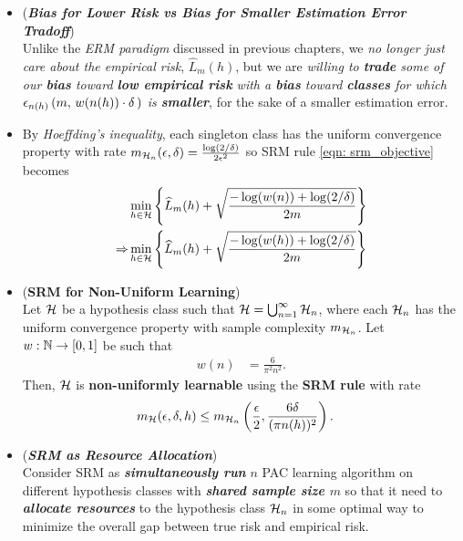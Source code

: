 \documentclass[11pt]{article}
\begin{document}
\begin{itemize}
\item \begin{remark} (\emph{\textbf{Bias for Lower Risk vs Bias for Smaller Estimation Error Tradoff}})\\
Unlike the \emph{ERM paradigm} discussed in previous chapters, we \emph{no longer just care about the empirical risk}, $\widehat{L}_m(h)$, but we are \emph{willing to \textbf{trade} some of our \textbf{bias} toward \textbf{low empirical risk} with a \textbf{bias} toward \textbf{classes} for which $\epsilon_{n(h)}\left(m, \,w(n(h)) \cdot \delta \,\right)$ is \textbf{smaller}}, for the sake of a smaller estimation error.
\end{remark}

\item \begin{remark}
By \emph{Hoeffding's inequality}, each singleton class has the uniform convergence property with rate $m_{{\mathcal H}_n}(\epsilon, \delta) = \frac{\log(2/\delta)}{2\epsilon^2}$ so SRM rule \eqref{eqn: srm_objective} becomes
\begin{align}
&\min_{h \in {\mathcal H}}\left\{\widehat{L}_{m}(h) + \sqrt{\frac{-\log(w(n)) + \log(2/\delta)}{2m}}\right\}  \label{eqn: srm_objective_hoeffding} \\
\Rightarrow & \min_{h \in {\mathcal H}}\left\{\widehat{L}_{m}(h) + \sqrt{\frac{-\log(w(h)) + \log(2/\delta)}{2m}}\right\}  \nonumber
\end{align}
\end{remark}

\item \begin{proposition} (\textbf{SRM for Non-Uniform Learning}) \citep{shalev2014understanding}\\
Let ${\mathcal H}$ be a hypothesis class such that ${\mathcal H} = \bigcup_{n = 1}^{\infty}{\mathcal H}_n$, where each ${\mathcal H}_n$ has the uniform convergence property with sample complexity $m_{{\mathcal H}_n}$. Let $w : {\mathbb N} \to [0,1]$ be such that
\begin{align*}
w(n) &= \frac{6}{\pi^2 n^2}.
\end{align*}
Then, ${\mathcal H}$ is \textbf{non-uniformly learnable} using the \textbf{SRM rule} with rate
\begin{align*}
m_{{\mathcal H}}(\epsilon, \delta, h) &\le m_{{\mathcal H}_n}\left(\frac{\epsilon}{2}, \frac{6 \delta}{(\pi n(h))^2}\right).
\end{align*}
\end{proposition}

\item \begin{remark} (\emph{\textbf{SRM as Resource Allocation}})\\
Consider SRM as \emph{\textbf{simultaneously run}} $n$ PAC learning algorithm on different hypothesis classes with \emph{\textbf{shared sample size $m$}} so that it  need to \emph{\textbf{allocate resources}} to the hypothesis class ${\mathcal H}_n$ in some optimal way to minimize the overall gap between true risk and empirical risk.
\end{remark}
\end{itemize}
\end{document}
